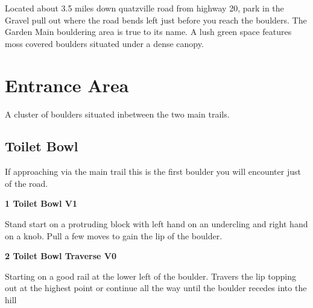 \begin{multicols*}{2}

\begin{minipage}{\columnwidth}
Located about 3.5 miles down quatzville road from highway 20, park in the Gravel pull out where the road bends left just before you reach the boulders. The Garden Main bouldering area is true to its name. A lush green space features moss covered boulders situated under a dense canopy.
\end{minipage}

		\section{Entrance Area}\label{sa:Entrance Area}
	\begin{minipage}{\columnwidth}
	A cluster of boulders situated inbetween the two main trails.
	\end{minipage}

			\subsection*{Toilet Bowl}\label{bf:Toilet Bowl}
			\begin{minipage}{\columnwidth}
			If approaching via the main trail this is the first boulder you will encounter just of the road.
			\end{minipage}
			

					\label{rt:Toilet Bowl}\colorbox{green!20}{\textbf{1 Toilet Bowl V1   }}
					\begin{adjustwidth}{0.5cm}{}
					\begin{minipage}{\linewidth}					
					Stand start on a protruding block with left hand on an undercling and right hand on a knob. Pull a few moves to gain the lip of the boulder.
					\end{minipage}
					\end{adjustwidth}
					\label{rt:Toilet Bowl Traverse}\colorbox{green!20}{\textbf{2 Toilet Bowl Traverse V0 \ding{72}   }}
					\begin{adjustwidth}{0.5cm}{}
					\begin{minipage}{\linewidth}					
					Starting on a good rail at the lower left of the boulder. Travers the lip topping out at the highest point or continue all the way until the boulder recedes into the hill
					\end{minipage}
					\end{adjustwidth}

\end{multicols*}
